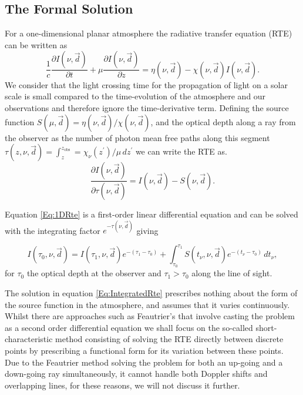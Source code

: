 \subsection{The Formal Solution}

For a one-dimensional planar atmosphere the radiative transfer equation (RTE) can be written as
\begin{equation}
    \frac{1}{c}\frac{\partial I(\nu, \vec{d})}{\partial t} + \mu \frac{\partial I(\nu, \vec{d})}{\partial z} = \eta(\nu, \vec{d}) - \chi(\nu, \vec{d})I(\nu, \vec{d}).
\end{equation}
We consider that the light crossing time for the propagation of light on a solar scale is small compared to the time-evolution of the atmosphere and our observations and therefore ignore the time-derivative term.
Defining the source function $S(\mu, \vec{d}) = \eta(\nu, \vec{d}) / \chi(\nu, \vec{d})$, and the optical depth along a ray from the observer as the number of photon mean free paths along this segment $\tau(z, \nu, \vec{d}) = \int_z^{z_{\mathrm{obs}}} = \chi_\nu(z^\prime) / \mu\, dz^\prime$ we can write the RTE as.
\begin{equation}
    \frac{\partial I(\nu, \vec{d})}{\partial \tau(\nu, \vec{d})} = I(\nu, \vec{d}) - S(\nu, \vec{d}).
    \label{Eq:1DRte}
\end{equation}

Equation \ref{Eq:1DRte} is a first-order linear differential equation and can be solved with the integrating factor $e^{-\tau(\nu, \vec{d})}$ giving

\begin{equation}
I(\tau_0, \nu, \vec{d}) = I(\tau_1, \nu, \vec{d}) e^{-(\tau_1 - \tau_0)} + \int_{\tau_0}^{\tau_1}S(t_\nu, \nu, \vec{d})e^{-(t_\nu - \tau_0)}\, dt_\nu,
\label{Eq:IntegratedRte}
\end{equation}
for $\tau_0$ the optical depth at the observer and $\tau_1 > \tau_0$ along the line of sight.

The solution in equation \ref{Eq:IntegratedRte} prescribes nothing about the form of the source function in the atmosphere, and assumes that it varies continuously.
Whilst there are approaches such as Feautrier's \citep{Feautrier1964} that involve casting the problem as a second order differential equation we shall focus on the so-called short-characteristic method consisting of solving the RTE directly between discrete points by prescribing a functional form for its variation between these points. Due to the Feautrier method solving the problem for both an up-going and a down-going ray simultaneously, it cannot handle both Doppler shifts and overlapping lines, for these reasons, we will not discuss it further.

